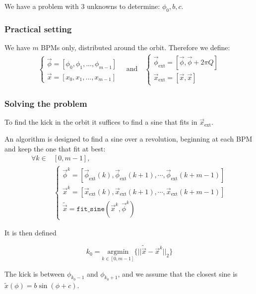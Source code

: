 We have a problem with 3 unknowns to determine: $\phi_0, b, c$. 

\subsubsection{Practical setting}

We have $m$ BPMs only, distributed around the orbit.
Therefore we define:
\begin{align}
\begin{cases}
\vec{\phi} = [\phi_0, \phi_1, ..., \phi_{m-1}] \\
\vec{x} = [x_0, x_1, ..., x_{m-1}]
\end{cases} \quad \mathrm{and} \quad
\begin{cases}
\vec{\phi}_\mathrm{ext} = [\vec{\phi}, \vec{\phi}+2\pi Q ]\\
\vec{x}_\mathrm{ext} = [\vec{x}, \vec{x}]
\end{cases}
\end{align}

\subsubsection{Solving the problem}

To find the kick in the orbit it suffices to find a sine that fits in $\vec{x}_\mathrm{ext}$.

An algorithm is designed to find a sine over a revolution, beginning at each BPM and keep the one that fit at best:
\begin{align}
\forall k \in &[0, m-1], \nonumber \\
&\begin{cases}
\vec{\phi}^k = [\vec{\phi}_\mathrm{ext}(k), \vec{\phi}_\mathrm{ext}(k+1), \cdots,  \vec{\phi}_\mathrm{ext}(k+m-1)]\\
\vec{x}^k = [\vec{x}_\mathrm{ext}(k), \vec{x}_\mathrm{ext}(k+1), \cdots,  \vec{x}_\mathrm{ext}(k+m-1)]\\
\tilde{\vec{x}} = \mathtt{fit\_sine}(\vec{x}^k, \vec{\phi}^k)
\end{cases}
\end{align}

It is then defined

\begin{equation}
k_0 = \underset{k \in [0, m-1]}{\textrm{argmin}}\{||\tilde{\vec{x}}-\vec{x}^k||_2\}
\end{equation}

The kick is between $\phi_{k_0-1}$ and $\phi_{k_0+1}$, and we assume that the closest sine is $\tilde{x}(\phi) = b \sin(\phi + c) $.

